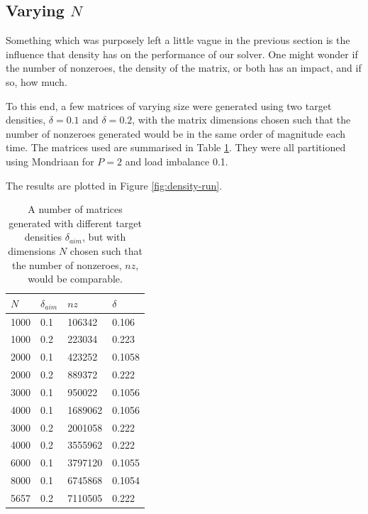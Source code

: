 \documentclass[a4paper]{article}
\begin{document}
\subsection{Varying $N$}\label{sec:nz-run}

Something which was purposely left a little vague in the previous section is the
influence that density has on the performance of our solver. One might wonder if the number of nonzeroes,
the density of the matrix, or both has an impact, and if so, how much.

To this end, a few matrices of varying size were generated using two target densities, $\delta=0.1$ and $\delta=0.2$, with
the matrix dimensions chosen such that the number of nonzeroes generated would be in the same order of magnitude each
time. The matrices used are summarised in Table \ref{tab:nz-mats}. They were all partitioned
using Mondriaan for $P=2$ and load imbalance 0.1.

The results are plotted in Figure \ref{fig:density-run}.

\begin{table}
    \centering
    \begin{tabular}{l|l|l|l}
        $N$ & $\delta_{aim}$ & $nz$ & $\delta$ \\ \hline
1000  & 0.1   &   106342   &   0.106\\
1000  & 0.2   &   223034   &   0.223\\
2000  & 0.1   &   423252   &   0.1058\\
2000  & 0.2   &   889372   &   0.222\\
3000  & 0.1   &   950022   &   0.1056\\
4000  & 0.1   &   1689062   &   0.1056\\
3000  & 0.2   &   2001058   &   0.222\\
4000  & 0.2   &   3555962   &   0.222\\
6000  & 0.1   &   3797120   &   0.1055\\
8000  & 0.1   &   6745868   &   0.1054\\
5657  & 0.2   &   7110505   &   0.222\\
    \end{tabular}
    \caption{A number of matrices generated with different target densities $\delta_{aim}$, but
with dimensions $N$ chosen such that the number of nonzeroes, $nz$, would be comparable.}
    \label{tab:nz-mats}
\end{table}
\end{document}
